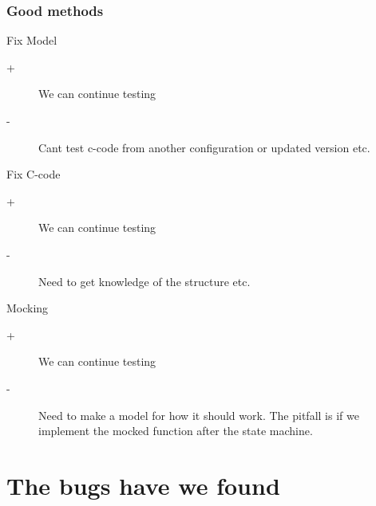 \documentclass{beamer}
\begin{document}
\begin{frame}
  \frametitle{Good methods}
  \begin{block}{Fix Model}
    \begin{description}
      \item[+] We can continue testing
      \item[-] Cant test c-code from another configuration or updated version etc.
    \end{description}
  \end{block}

  \begin{block}{Fix C-code}
    \begin{description}
      \item[+] We can continue testing
      \item[-] Need to get knowledge of the structure etc.
    \end{description}
  \end{block}

  \begin{block}{Mocking}
    \begin{description}
      \item[+] We can continue testing
      \item[-] Need to make a model for how it should work. The pitfall is if we
        implement the mocked function after the state machine.
    \end{description}
  \end{block}
\end{frame}

\section{The bugs have we found}
\end{document}
